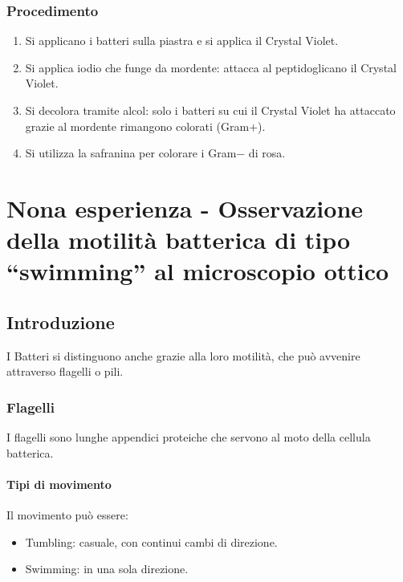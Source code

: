 		\subsubsection{Procedimento}
		\begin{enumerate}
			\item Si applicano i batteri sulla piastra e si applica il Crystal Violet.
			\item Si applica iodio che funge da mordente: attacca al peptidoglicano il Crystal Violet.
			\item Si decolora tramite alcol: solo i batteri su cui il Crystal Violet ha attaccato grazie al mordente rimangono colorati (Gram$+$).
			\item Si utilizza la safranina per colorare i Gram$-$ di rosa.
		\end{enumerate}

\section{Nona esperienza - Osservazione della motilit\`a batterica di tipo ``swimming'' al microscopio ottico}

	\subsection{Introduzione}
	I Batteri si distinguono anche grazie alla loro motilit\`a, che pu\`o avvenire attraverso flagelli o pili.

		\subsubsection{Flagelli}
		I flagelli sono lunghe appendici proteiche che servono al moto della cellula batterica.
			
			\paragraph{Tipi di movimento}
			Il movimento pu\`o essere:
			\begin{multicols}{2}
				\begin{itemize}
					\item Tumbling: casuale, con continui cambi di direzione.
					\item Swimming: in una sola direzione.
				\end{itemize}
			\end{multicols}

